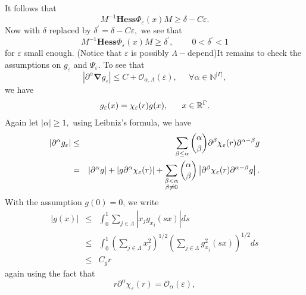 \documentclass{article}
\begin{document}
It follows that 
\begin{equation}
M^{-1}\mathbf{Hess}\Phi _{\varepsilon }(x)M\geq \delta -C\varepsilon .
\end{equation}%
Now with $\delta $ replaced by $\delta ^{\prime }=\delta -C\varepsilon ,$ we
see that 
\begin{equation}
M^{-1}\mathbf{Hess}\Phi _{\varepsilon }(x)M\geq \delta ^{\prime
},\;\;\;\;\;\;\;\;0<\delta ^{\prime }<1
\end{equation}%
for $\varepsilon $ small enough. (Notice that $\varepsilon $ is possibly $%
\Lambda -$depend)It remains to check the assumptions on $g_{\varepsilon }$
and $\Psi _{\varepsilon }.$ To see that%
\begin{equation}
\left| \partial ^{\alpha }\mathbf{\nabla }g_{\varepsilon }\right| \leq C+%
\mathcal{O}_{\alpha ,\Lambda }(\varepsilon ),\;\ \ \ \ \ \forall \alpha \in 
\mathbb{N}^{\left| \Gamma \right| },
\end{equation}%
we have 
\begin{equation*}
g_{\varepsilon }(x)=\chi _{\varepsilon }(r)g(x),\text{ \ \ \ \ }x\in \mathbb{%
R}^{\Gamma }.
\end{equation*}%
Again let $\left| \alpha \right| \geq 1,$ using Leibniz's formula, we have 
\begin{eqnarray*}
\left| \partial ^{\alpha }g_{\varepsilon }\right| &\leq &\sum_{\beta \leq
\alpha }\dbinom{\alpha }{\beta }\partial ^{\beta }\chi _{\varepsilon
}(r)\partial ^{\alpha -\beta }g \\
&=&\left| \partial ^{\alpha }g\right| +\left| g\partial ^{\alpha }\chi
_{\varepsilon }(r)\right| +\sum_{\substack{ \beta <\alpha  \\ \beta \neq 0}}%
\dbinom{\alpha }{\beta }\left| \partial ^{\beta }\chi _{\varepsilon
}(r)\partial ^{\alpha -\beta }g\right| .
\end{eqnarray*}%
With the assumption $g(0)=0$, we write 
\begin{eqnarray}
\left| g(x)\right| &\leq &\int_{0}^{1}\sum_{j\in \Lambda }\left|
x_{j}g_{x_{j}}(sx)\right| ds \\
&\leq &\int_{0}^{1}\left( \sum_{j\in \Lambda }x_{j}^{2}\right) ^{1/2}\left(
\sum_{j\in \Lambda }g_{x_{j}}^{2}(sx)\right) ^{1/2}ds \\
&\leq &C_{g}r
\end{eqnarray}%
again using the fact that 
\begin{equation*}
r\partial ^{\alpha }\chi _{\varepsilon }(r)=\mathcal{O}_{\alpha
}(\varepsilon ),
\end{equation*}%
\end{document}
